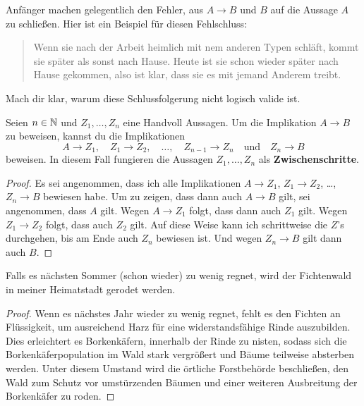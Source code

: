 \begin{bem}
    Anfänger machen gelegentlich den Fehler, aus $A\to B$ und $B$ auf die Aussage $A$ zu schließen. Hier ist ein Beispiel für diesen Fehlschluss:
    \begin{quote}
        Wenn sie nach der Arbeit heimlich mit nem anderen Typen schläft, kommt sie später als sonst nach Hause. Heute ist sie schon wieder später nach Hause gekommen, also ist klar, dass sie es mit jemand Anderem treibt.
    \end{quote}
    Mach dir klar, warum diese Schlussfolgerung nicht logisch valide ist.
\end{bem}


\begin{satz} \label{implikationtrans}
    Seien $n\in \mathbb N$ und $Z_1,\dots , Z_n$ eine Handvoll Aussagen. Um die Implikation $A\to B$ zu beweisen, kannst du die Implikationen
        \[ A\to Z_1,\quad Z_1\to Z_2,\quad \dots ,\quad Z_{n-1}\to Z_n\quad \text{und}\quad Z_n\to B \]
    beweisen. In diesem Fall fungieren die Aussagen $Z_1,\dots , Z_n$ als \textbf{Zwischenschritte}.
\end{satz}
\begin{proof}
    Es sei angenommen, dass ich alle Implikationen $A\to Z_1$, $Z_1\to Z_2$, \dots , $Z_n\to B$ bewiesen habe. Um zu zeigen, dass dann auch $A\to B$ gilt, sei angenommen, dass $A$ gilt. Wegen $A\to Z_1$ folgt, dass dann auch $Z_1$ gilt. Wegen $Z_1\to Z_2$ folgt, dass auch $Z_2$ gilt. Auf diese Weise kann ich schrittweise die $Z$'s durchgehen, bis am Ende auch $Z_n$ bewiesen ist. Und wegen $Z_n\to B$ gilt dann auch $B$.
\end{proof}


\begin{bsp}
    Falls es nächsten Sommer (schon wieder) zu wenig regnet, wird der Fichtenwald in meiner Heimatstadt gerodet werden.
\end{bsp}
\begin{proof}
    Wenn es nächstes Jahr wieder zu wenig regnet, fehlt es den Fichten an Flüssigkeit, um ausreichend Harz für eine widerstandsfähige Rinde auszubilden. Dies erleichtert es Borkenkäfern, innerhalb der Rinde zu nisten, sodass sich die Borkenkäferpopulation im Wald stark vergrößert und Bäume teilweise absterben werden. Unter diesem Umstand wird die örtliche Forstbehörde beschließen, den Wald zum Schutz vor umstürzenden Bäumen und einer weiteren Ausbreitung der Borkenkäfer zu roden.
\end{proof}






